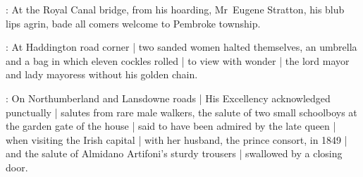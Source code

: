 :
At the Royal Canal bridge,
from his hoarding,
Mr~Eugene Stratton,
his blub lips agrin,
bade all comers welcome to Pembroke township.

:
At Haddington road corner |
two sanded women halted themselves,
an umbrella and a bag in which eleven cockles rolled |
to view with wonder |
the lord mayor and lady mayoress without his golden chain.

:
On Northumberland and Lansdowne roads |
His Excellency acknowledged punctually |
salutes from rare male walkers,
the salute of two small schoolboys
at the garden gate of the house |
said to have been admired by the late queen |
when visiting the Irish capital |
with her husband, the prince consort, in 1849 |
and the salute of Almidano Artifoni's sturdy trousers |
swallowed by a closing door.
